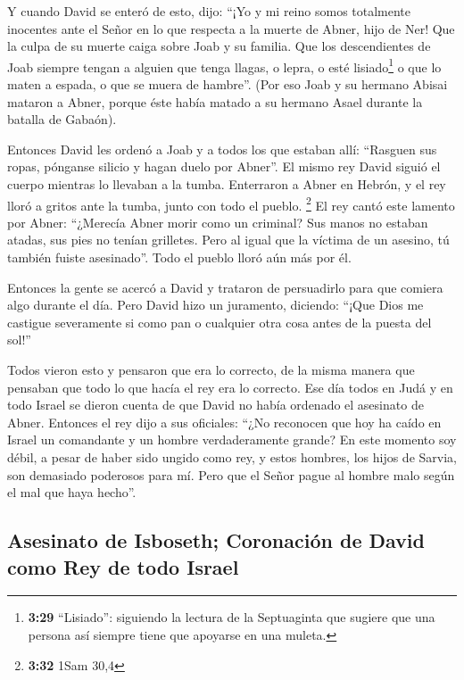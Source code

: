  Y cuando David se enteró de esto, dijo: ``¡Yo y mi reino
somos totalmente inocentes ante el Señor en lo que respecta a la muerte
de Abner, hijo de Ner!  Que la culpa de su muerte caiga
sobre Joab y su familia. Que los descendientes de Joab siempre tengan a
alguien que tenga llagas, o lepra, o esté lisiado\footnote{\textbf{3:29}
  ``Lisiado'': siguiendo la lectura de la Septuaginta que sugiere que
  una persona así siempre tiene que apoyarse en una muleta.} o que lo
maten a espada, o que se muera de hambre''.  (Por eso
Joab y su hermano Abisai mataron a Abner, porque éste había matado a su
hermano Asael durante la batalla de Gabaón).

 Entonces David les ordenó a Joab y a todos los que
estaban allí: ``Rasguen sus ropas, pónganse silicio y hagan duelo por
Abner''. El mismo rey David siguió el cuerpo mientras lo llevaban a la
tumba.  Enterraron a Abner en Hebrón, y el rey lloró a
gritos ante la tumba, junto con todo el pueblo. \footnote{\textbf{3:32}
  1Sam 30,4}  El rey cantó este lamento por Abner:
``¿Merecía Abner morir como un criminal?  Sus manos no
estaban atadas, sus pies no tenían grilletes. Pero al igual que la
víctima de un asesino, tú también fuiste asesinado''. Todo el pueblo
lloró aún más por él.

 Entonces la gente se acercó a David y trataron de
persuadirlo para que comiera algo durante el día. Pero David hizo un
juramento, diciendo: ``¡Que Dios me castigue severamente si como pan o
cualquier otra cosa antes de la puesta del sol!''

 Todos vieron esto y pensaron que era lo correcto, de la
misma manera que pensaban que todo lo que hacía el rey era lo correcto.
 Ese día todos en Judá y en todo Israel se dieron cuenta
de que David no había ordenado el asesinato de Abner. 
Entonces el rey dijo a sus oficiales: ``¿No reconocen que hoy ha caído
en Israel un comandante y un hombre verdaderamente grande?
 En este momento soy débil, a pesar de haber sido ungido
como rey, y estos hombres, los hijos de Sarvia, son demasiado poderosos
para mí. Pero que el Señor pague al hombre malo según el mal que haya
hecho''.

\hypertarget{asesinato-de-isboseth-coronaciuxf3n-de-david-como-rey-de-todo-israel}{%
\subsection{Asesinato de Isboseth; Coronación de David como Rey de todo
Israel}\label{asesinato-de-isboseth-coronaciuxf3n-de-david-como-rey-de-todo-israel}}


